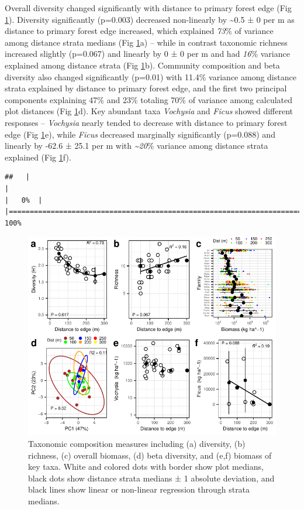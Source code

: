 \documentclass[
  12pt,
]{article}
\begin{document}
Overall diversity changed significantly with distance to primary forest edge
(Fig \ref{fig:taxa}).
Diversity significantly
(p=0.003)
decreased non-linearly by
\textasciitilde0.5 ±
0 per m
as distance to primary forest edge increased,
which explained
\emph{73}\% of variance
among distance strata medians
(Fig \ref{fig:taxa}a) --
while in contrast taxonomic richness increased slightly
(p=0.067)
and linearly
by
0 ±
0 per m
and had \emph{16}\% variance explained
among distance strata
(Fig \ref{fig:taxa}b).
Community composition and beta diversity also changed significantly
(p=0.01) with
11.4\%
variance among distance strata explained by distance to primary forest edge,
and the first two principal components explaining
47\% and
23\% totaling
70\%
of variance among calculated plot distances
(Fig \ref{fig:taxa}d).
Key abundant taxa \emph{Vochysia} and \emph{Ficus} showed different responses -- \emph{Vochysia} nearly tended to decrease with distance to primary forest edge
(Fig \ref{fig:taxa}e),
while \emph{Ficus} decreased marginally significantly
(p=0.088)
and linearly by
-62.6 ±
25.1 per m
with \emph{\textasciitilde20}\% variance among distance strata explained
(Fig \ref{fig:taxa}f).

\begin{verbatim}
##   |                                                                              |                                                                      |   0%  |                                                                              |======================================================================| 100%
\end{verbatim}

\begin{figure}
\centering
\includegraphics{merge_files/figure-latex/taxa-1.pdf}
\caption{\label{fig:taxa} Taxonomic composition measures including (a) diversity, (b) richness, (c) overall biomass, (d) beta diversity, and (e,f) biomass of key taxa. White and colored dots with border show plot medians, black dots show distance strata medians ± 1 absolute deviation, and black lines show linear or non-linear regression through strata medians.}
\end{figure}
\end{document}
